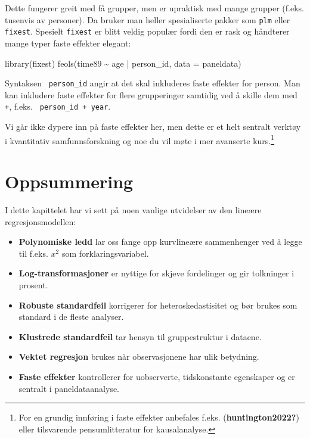 \documentclass[
  norsk,
  letterpaper,
  DIV=11,
  numbers=noendperiod]{scrreprt}
\newenvironment{Shaded}{\begin{snugshade}}{\end{snugshade}}
\newcommand{\AttributeTok}[1]{\textcolor[rgb]{0.40,0.45,0.13}{#1}}
\newcommand{\FunctionTok}[1]{\textcolor[rgb]{0.28,0.35,0.67}{#1}}
\newcommand{\NormalTok}[1]{\textcolor[rgb]{0.00,0.23,0.31}{#1}}
\newcommand{\SpecialCharTok}[1]{\textcolor[rgb]{0.37,0.37,0.37}{#1}}
\providecommand{\tightlist}{%
  \setlength{\itemsep}{0pt}\setlength{\parskip}{0pt}}
\theoremstyle{definition}
\theoremstyle{remark}
\begin{document}
Dette fungerer greit med få grupper, men er upraktisk med mange grupper
(f.eks. tusenvis av personer). Da bruker man heller spesialiserte pakker
som \texttt{plm} eller \texttt{fixest}. Spesielt \texttt{fixest} er
blitt veldig populær fordi den er rask og håndterer mange typer faste
effekter elegant:

\begin{Shaded}
\begin{Highlighting}[]
\FunctionTok{library}\NormalTok{(fixest)}
\FunctionTok{feols}\NormalTok{(time89 }\SpecialCharTok{\textasciitilde{}}\NormalTok{ age }\SpecialCharTok{|}\NormalTok{ person\_id, }\AttributeTok{data =}\NormalTok{ paneldata)}
\end{Highlighting}
\end{Shaded}

Syntaksen \texttt{\textbar{}\ person\_id} angir at det skal inkluderes
faste effekter for person. Man kan inkludere faste effekter for flere
grupperinger samtidig ved å skille dem med \texttt{+}, f.eks.
\texttt{\textbar{}\ person\_id\ +\ year}.

Vi går ikke dypere inn på faste effekter her, men dette er et helt
sentralt verktøy i kvantitativ samfunnsforskning og noe du vil møte i
mer avanserte kurs.\footnote{For en grundig innføring i faste effekter
  anbefales f.eks. (\textbf{huntington2022?}) eller tilsvarende
  pensumlitteratur for kausalanalyse.}

\section{Oppsummering}\label{oppsummering-2}

I dette kapittelet har vi sett på noen vanlige utvidelser av den lineære
regresjonsmodellen:

\begin{itemize}
\tightlist
\item
  \textbf{Polynomiske ledd} lar oss fange opp kurvlineære sammenhenger
  ved å legge til f.eks. \(x^2\) som forklaringsvariabel.
\item
  \textbf{Log-transformasjoner} er nyttige for skjeve fordelinger og gir
  tolkninger i prosent.
\item
  \textbf{Robuste standardfeil} korrigerer for heteroskedastisitet og
  bør brukes som standard i de fleste analyser.
\item
  \textbf{Klustrede standardfeil} tar hensyn til gruppestruktur i
  dataene.
\item
  \textbf{Vektet regresjon} brukes når observasjonene har ulik
  betydning.
\item
  \textbf{Faste effekter} kontrollerer for uobserverte, tidskonstante
  egenskaper og er sentralt i paneldataanalyse.
\end{itemize}
\end{document}
